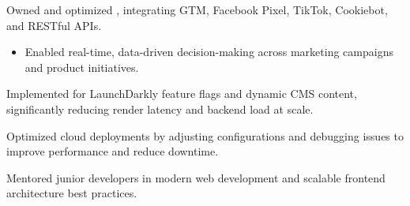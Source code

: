 \begin{cventries}
{\begin{cvitems}
\begin{itemize}[leftmargin=2.5ex, itemsep=.8mm]
      \vspace{.3mm}
    \end{itemize}
    \item {Owned and optimized , integrating GTM, Facebook Pixel, TikTok, Cookiebot, and RESTful APIs.}
    \begin{itemize}[leftmargin=2.5ex, itemsep=.8mm]
      \vspace{.8mm}
      \item {Enabled real-time, data-driven decision-making across marketing campaigns and product initiatives.}
      \vspace{.3mm}
    \end{itemize}
    \item {Implemented  for LaunchDarkly feature flags and dynamic CMS content, significantly reducing render latency and backend load at scale.}
    \item {Optimized cloud deployments by adjusting  configurations and debugging issues to improve performance and reduce downtime.}
    \item {Mentored junior developers in modern web development and scalable frontend architecture best practices.}
  \end{cvitems}
}


\end{cventries}
